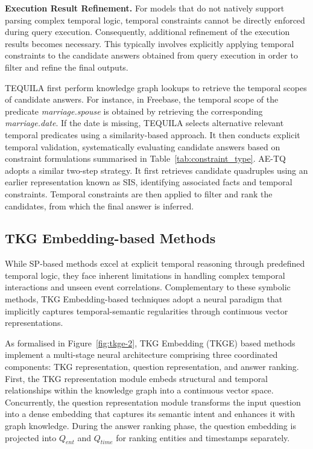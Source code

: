 {\textbf{Execution Result Refinement.}
For models that do not natively support parsing complex temporal logic, temporal constraints cannot be directly enforced during query execution. Consequently, additional refinement of the execution results becomes necessary. This typically involves explicitly applying temporal constraints to the candidate answers obtained from query execution in order to filter and refine the final outputs.

TEQUILA first perform knowledge graph lookups to retrieve the temporal scopes of candidate answers. For instance, in Freebase, the temporal scope of the predicate \textit{marriage.spouse} is obtained by retrieving the corresponding \textit{marriage.date}. If the date is missing, TEQUILA selects alternative relevant temporal predicates using a similarity-based approach. It then conducts explicit temporal validation, systematically evaluating candidate answers based on constraint formulations summarised in Table~\ref{tab:constraint_type}.
AE-TQ adopts a similar two-step strategy. It first retrieves candidate quadruples using an earlier representation known as SIS, identifying associated facts and temporal constraints. Temporal constraints are then applied to filter and rank the candidates, from which the final answer is inferred.



\subsection{TKG Embedding-based Methods\label{sec-tkge}}
While SP-based methods excel at explicit temporal reasoning through predefined temporal logic, they face inherent limitations in handling complex temporal interactions and unseen event correlations. Complementary to these symbolic methods, TKG Embedding-based techniques adopt a neural paradigm that implicitly captures temporal-semantic regularities through continuous vector representations. 

As formalised in Figure~\ref{fig:tkge-2}, TKG Embedding (TKGE) based methods implement a multi-stage neural architecture comprising three coordinated components: TKG representation, question representation, and answer ranking. First, the TKG representation module embeds structural and temporal relationships within the knowledge graph into a continuous vector space. Concurrently, the question representation module transforms the input question into a dense embedding that captures its semantic intent and enhances it with graph knowledge. During the answer ranking phase, the question embedding is projected into $Q_{ent}$ and $Q_{time}$ for ranking entities and timestamps separately.

}
